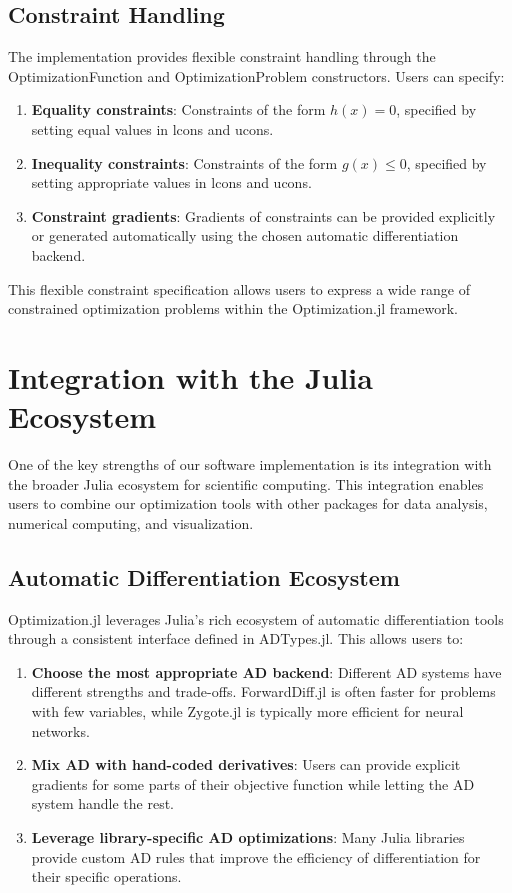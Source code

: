 \subsection{Constraint Handling}

The implementation provides flexible constraint handling through the OptimizationFunction and OptimizationProblem constructors. Users can specify:

\begin{enumerate}
\item \textbf{Equality constraints}: Constraints of the form $h(x) = 0$, specified by setting equal values in lcons and ucons.

\item \textbf{Inequality constraints}: Constraints of the form $g(x) \leq 0$, specified by setting appropriate values in lcons and ucons.

\item \textbf{Constraint gradients}: Gradients of constraints can be provided explicitly or generated automatically using the chosen automatic differentiation backend.
\end{enumerate}

This flexible constraint specification allows users to express a wide range of constrained optimization problems within the Optimization.jl framework.

\section{Integration with the Julia Ecosystem}

One of the key strengths of our software implementation is its integration with the broader Julia ecosystem for scientific computing. This integration enables users to combine our optimization tools with other packages for data analysis, numerical computing, and visualization.

\subsection{Automatic Differentiation Ecosystem}

Optimization.jl leverages Julia's rich ecosystem of automatic differentiation tools through a consistent interface defined in ADTypes.jl. This allows users to:

\begin{enumerate}
\item \textbf{Choose the most appropriate AD backend}: Different AD systems have different strengths and trade-offs. ForwardDiff.jl is often faster for problems with few variables, while Zygote.jl is typically more efficient for neural networks.

\item \textbf{Mix AD with hand-coded derivatives}: Users can provide explicit gradients for some parts of their objective function while letting the AD system handle the rest.

\item \textbf{Leverage library-specific AD optimizations}: Many Julia libraries provide custom AD rules that improve the efficiency of differentiation for their specific operations.
\end{enumerate}

